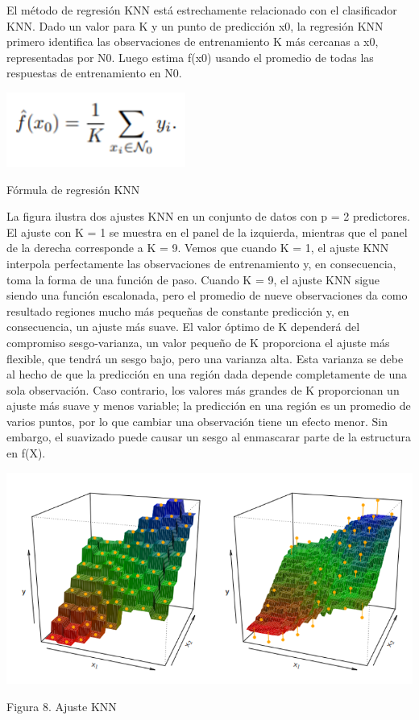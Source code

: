 \documentclass[
  letterpaper,
  DIV=11,
  numbers=noendperiod]{scrartcl}
\begin{document}
El método de regresión KNN está estrechamente relacionado con el
clasificador KNN. Dado un valor para K y un punto de predicción x0, la
regresión KNN primero identifica las observaciones de entrenamiento K
más cercanas a x0, representadas por N0. Luego estima f(x0) usando el
promedio de todas las respuestas de entrenamiento en N0.

\begin{Fórmula de regresión KNN}

{\centering \includegraphics{f5.png}

}

\caption{Fórmula de regresión KNN}

\end{Fórmula de regresión KNN}

La figura ilustra dos ajustes KNN en un conjunto de datos con p = 2
predictores. El ajuste con K = 1 se muestra en el panel de la izquierda,
mientras que el panel de la derecha corresponde a K = 9. Vemos que
cuando K = 1, el ajuste KNN interpola perfectamente las observaciones de
entrenamiento y, en consecuencia, toma la forma de una función de paso.
Cuando K = 9, el ajuste KNN sigue siendo una función escalonada, pero el
promedio de nueve observaciones da como resultado regiones mucho más
pequeñas de constante predicción y, en consecuencia, un ajuste más
suave. El valor óptimo de K dependerá del compromiso sesgo-varianza, un
valor pequeño de K proporciona el ajuste más flexible, que tendrá un
sesgo bajo, pero una varianza alta. Esta varianza se debe al hecho de
que la predicción en una región dada depende completamente de una sola
observación. Caso contrario, los valores más grandes de K proporcionan
un ajuste más suave y menos variable; la predicción en una región es un
promedio de varios puntos, por lo que cambiar una observación tiene un
efecto menor. Sin embargo, el suavizado puede causar un sesgo al
enmascarar parte de la estructura en f(X).

\begin{Figura 8. Ajuste KNN}

{\centering \includegraphics{cap17.png}

}

\caption{Figura 8. Ajuste KNN}

\end{Figura 8. Ajuste KNN}
\end{document}
